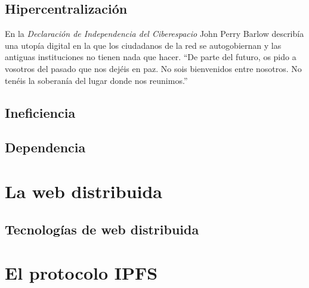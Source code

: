 \documentclass[12pt]{article} %
\begin{document}

\subsection{Hipercentralización} %
\label{sub:hipercentralización}

En la \textit{Declaración de Independencia del Ciberespacio}\cite{cyberspace-independence} John Perry Barlow describía una utopía digital en la que los ciudadanos de la red se autogobiernan y las antiguas instituciones no tienen nada que hacer. ``De parte del futuro, os pido a vosotros del pasado que nos dejéis en paz. No sois bienvenidos entre nosotros. No tenéis la soberanía del lugar donde nos reunimos.''


\subsection{Ineficiencia} %
\label{sub:ineficiencia}


\subsection{Dependencia} %
\label{sub:dependencia}



\section{La web distribuida} %
\label{sec:la_web_distribuida}

\subsection{Tecnologías de web distribuida} %
\label{sub:tecnologías_de_web_distribuida}



\section{El protocolo IPFS} %
\label{sec:el_protocolo_ipfs}
\end{document}

